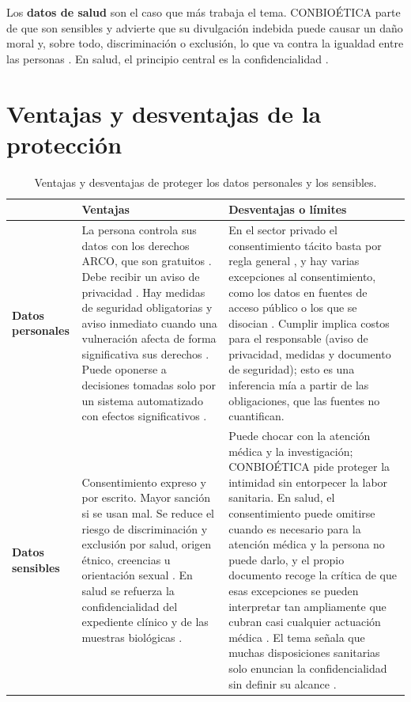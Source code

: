 \documentclass[11pt,letterpaper]{article}
\begin{document}
Los \textbf{datos de salud} son el caso que más trabaja el tema. CONBIOÉTICA parte de que son sensibles y advierte que su divulgación indebida puede causar un daño moral y, sobre todo, discriminación o exclusión, lo que va contra la igualdad entre las personas \parencite{conbioetica2014}. En salud, el principio central es la confidencialidad \parencite{conbioetica2014,iae_u6_t61}.

\section{Ventajas y desventajas de la protección}

\begin{table}[H]
\centering
\scriptsize
\renewcommand{\arraystretch}{1.25}
\begin{tabularx}{\textwidth}{@{}p{2.6cm}XX@{}}
\toprule
 & \textbf{Ventajas} & \textbf{Desventajas o límites} \\
\midrule
\textbf{Datos personales} &
La persona controla sus datos con los derechos ARCO, que son gratuitos \parencite[art.~44]{lgpdppso2025}. Debe recibir un aviso de privacidad \parencite[art.~14]{lfpdppp2025}. Hay medidas de seguridad obligatorias y aviso inmediato cuando una vulneración afecta de forma significativa sus derechos \parencite[arts.~18 y 19]{lfpdppp2025}. Puede oponerse a decisiones tomadas solo por un sistema automatizado con efectos significativos \parencite[art.~26]{lfpdppp2025}. &
En el sector privado el consentimiento tácito basta por regla general \parencite[art.~7]{lfpdppp2025}, y hay varias excepciones al consentimiento, como los datos en fuentes de acceso público o los que se disocian \parencite[art.~9]{lfpdppp2025}. Cumplir implica costos para el responsable (aviso de privacidad, medidas y documento de seguridad); esto es una inferencia mía a partir de las obligaciones, que las fuentes no cuantifican. \\
\addlinespace
\textbf{Datos sensibles} &
Consentimiento expreso y por escrito. Mayor sanción si se usan mal. Se reduce el riesgo de discriminación y exclusión por salud, origen étnico, creencias u orientación sexual \parencite{conbioetica2014}. En salud se refuerza la confidencialidad del expediente clínico y de las muestras biológicas \parencite{iae_u6_t61}. &
Puede chocar con la atención médica y la investigación; CONBIOÉTICA pide proteger la intimidad sin entorpecer la labor sanitaria. En salud, el consentimiento puede omitirse cuando es necesario para la atención médica y la persona no puede darlo, y el propio documento recoge la crítica de que esas excepciones se pueden interpretar tan ampliamente que cubran casi cualquier actuación médica \parencite{conbioetica2014}. El tema señala que muchas disposiciones sanitarias solo enuncian la confidencialidad sin definir su alcance \parencite{iae_u6_t61}. \\
\bottomrule
\end{tabularx}
\caption{Ventajas y desventajas de proteger los datos personales y los sensibles.}\label{tab:ventajas}
\end{table}
\end{document}
